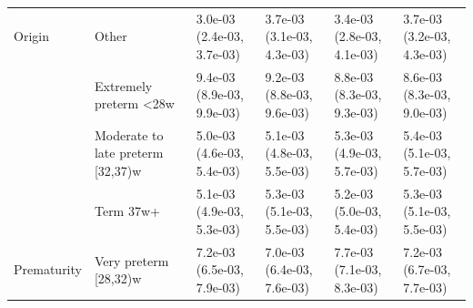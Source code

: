 \documentclass[smallextended]{svjour3} %
\begin{document}
\begin{landscape}
\begin{table}[t]
\begin{tabular}{llllll}
\multirow{-4}{*}{\raggedright\arraybackslash Origin} & Other & 3.0e-03 (2.4e-03, 3.7e-03) & 3.7e-03 (3.1e-03, 4.3e-03) & 3.4e-03 (2.8e-03, 4.1e-03) & 3.7e-03 (3.2e-03, 4.3e-03)\\
\cmidrule{1-6}
 & Extremely preterm <28w & 9.4e-03 (8.9e-03, 9.9e-03) & 9.2e-03 (8.8e-03, 9.6e-03) & 8.8e-03 (8.3e-03, 9.3e-03) & 8.6e-03 (8.3e-03, 9.0e-03)\\

 & Moderate to late preterm [32,37)w & 5.0e-03 (4.6e-03, 5.4e-03) & 5.1e-03 (4.8e-03, 5.5e-03) & 5.3e-03 (4.9e-03, 5.7e-03) & 5.4e-03 (5.1e-03, 5.7e-03)\\

 & Term 37w+ & 5.1e-03 (4.9e-03, 5.3e-03) & 5.3e-03 (5.1e-03, 5.5e-03) & 5.2e-03 (5.0e-03, 5.4e-03) & 5.3e-03 (5.1e-03, 5.5e-03)\\

\multirow{-4}{*}{\raggedright\arraybackslash Prematurity} & Very preterm [28,32)w & 7.2e-03 (6.5e-03, 7.9e-03) & 7.0e-03 (6.4e-03, 7.6e-03) & 7.7e-03 (7.1e-03, 8.3e-03) & 7.2e-03 (6.7e-03, 7.7e-03)\\
\bottomrule
\end{tabular}
\end{table}
\end{landscape}

\clearpage
\end{document}
